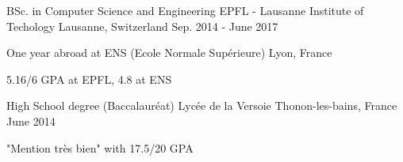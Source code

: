 


\begin{cventries}


\cventry
{BSc. in Computer Science and Engineering} %
{EPFL - Lausanne Institute of Techology} %
{Lausanne, Switzerland} %
{Sep. 2014 - June 2017} %
{ %
\begin{cvitems}
\item {One year abroad at ENS (Ecole Normale Supérieure) Lyon, France}
\item {5.16/6 GPA at EPFL, 4.8 at ENS}
\end{cvitems}
}


\cventry
{High School degree (Baccalauréat)} %
{Lycée de la Versoie} %
{Thonon-les-bains, France} %
{June 2014} %
{ %
	\begin{cvitems}
		\item {"Mention très bien" with 17.5/20 GPA}
	\end{cvitems}
}


\end{cventries}